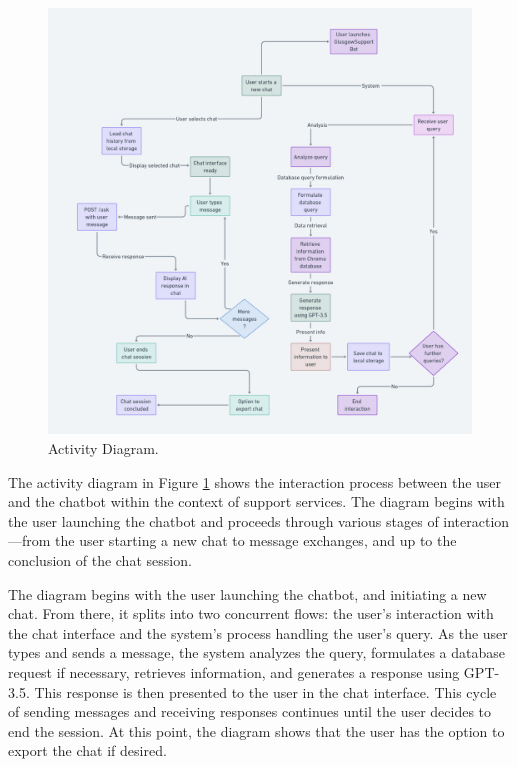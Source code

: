 \documentclass{l4proj}
\begin{document}
\begin{figure}[h!]
  \centering
  \begin{adjustbox}{center,max height=0.40\textheight, max width=\linewidth}
    \includegraphics{images/partialactivity.png}
  \end{adjustbox}
  \caption{Activity Diagram.}
  \label{fig:Activity Diagram Partial}
\end{figure}

The activity diagram in Figure \ref{fig:Activity Diagram Partial} shows the interaction process between the user and the chatbot within the context of support services. The diagram begins with the user launching the chatbot and proceeds through various stages of interaction—from the user starting a new chat to message exchanges, and up to the conclusion of the chat session.

The diagram begins with the user launching the chatbot, and initiating a new chat. From there, it splits into two concurrent flows: the user's interaction with the chat interface and the system's process handling the user's query. As the user types and sends a message, the system analyzes the query, formulates a database request if necessary, retrieves information, and generates a response using GPT-3.5. This response is then presented to the user in the chat interface. This cycle of sending messages and receiving responses continues until the user decides to end the session. At this point, the diagram shows that the user has the option to export the chat if desired.
\end{document}
